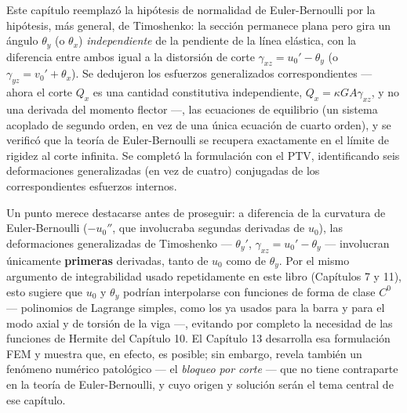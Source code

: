Este capítulo reemplazó la hipótesis de normalidad de Euler-Bernoulli por la hipótesis, más general, de Timoshenko: la sección permanece plana pero gira un ángulo $\theta_y$ (o $\theta_x$) \emph{independiente} de la pendiente de la línea elástica, con la diferencia entre ambos igual a la distorsión de corte $\gamma_{xz}=u_0'-\theta_y$ (o $\gamma_{yz}=v_0'+\theta_x$). Se dedujeron los esfuerzos generalizados correspondientes --- ahora el corte $Q_x$ es una cantidad constitutiva independiente, $Q_x=\kappa GA\gamma_{xz}$, y no una derivada del momento flector ---, las ecuaciones de equilibrio (un sistema acoplado de segundo orden, en vez de una única ecuación de cuarto orden), y se verificó que la teoría de Euler-Bernoulli se recupera exactamente en el límite de rigidez al corte infinita. Se completó la formulación con el PTV, identificando seis deformaciones generalizadas (en vez de cuatro) conjugadas de los correspondientes esfuerzos internos.

Un punto merece destacarse antes de proseguir: a diferencia de la curvatura de Euler-Bernoulli ($-u_0''$, que involucraba segundas derivadas de $u_0$), las deformaciones generalizadas de Timoshenko --- $\theta_y'$, $\gamma_{xz}=u_0'-\theta_y$ --- involucran únicamente \textbf{primeras} derivadas, tanto de $u_0$ como de $\theta_y$. Por el mismo argumento de integrabilidad usado repetidamente en este libro (Capítulos 7 y 11), esto sugiere que $u_0$ y $\theta_y$ podrían interpolarse con funciones de forma de clase $C^0$ --- polinomios de Lagrange simples, como los ya usados para la barra y para el modo axial y de torsión de la viga ---, evitando por completo la necesidad de las funciones de Hermite del Capítulo 10. El Capítulo 13 desarrolla esa formulación FEM y muestra que, en efecto, es posible; sin embargo, revela también un fenómeno numérico patológico --- el \emph{bloqueo por corte} --- que no tiene contraparte en la teoría de Euler-Bernoulli, y cuyo origen y solución serán el tema central de ese capítulo.
